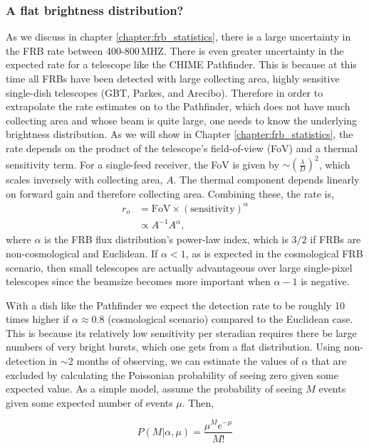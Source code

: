 \subsubsection{A flat brightness distribution?}
As we discuss in chapter \ref{chapter:frb_statistics}, there is 
a large uncertainty in the FRB rate between 400-800\,MHZ. There 
is even greater uncertainty in the expected rate for a 
telescope like the CHIME Pathfinder. This is because at this time
all FRBs
have been detected with large collecting area, highly sensitive single-dish 
telescopes (GBT, Parkes, and Arecibo). Therefore in order to 
extrapolate the rate estimates on to the Pathfinder, which 
does not have much collecting area and whose beam is quite large, one 
needs to know the underlying brightness distribution. As we will show 
in Chapter \ref{chapter:frb_statistics}, the rate depends on the product 
of the telescope's field-of-view (FoV) and a thermal sensitivity term. 
For a single-feed receiver, the FoV is given by 
$\sim \left(\frac{\lambda}{D}\right)^2$, which scales inversely with 
collecting area, $A$. The thermal component depends linearly
on forward gain and therefore collecting area. Combining these, 
the rate is, 
\begin{align}
r_o &= \textrm{FoV} \times \left(\textrm{sensitivity}\right)^\alpha\\
     & \propto A^{-1} A^\alpha,
\end{align}
where $\alpha$ is the FRB flux distribution's power-law index, which is 
$3/2$ if FRBs are non-cosmological and Euclidean. If $\alpha < 1$, 
as is expected in the cosmological FRB scenario, then 
small telescopes are actually advantageous over large single-pixel telescopes 
since the beamsize becomes more important when $\alpha-1$ is negative. 

With a dish like the Pathfinder
we expect the detection rate to be 
roughly 10 times higher if $\alpha\approx 0.8$ (cosmological scenario) 
compared to the Euclidean case. This is because its relatively 
low sensitivity per steradian requires there be large numbers 
of very bright bursts, which one gets from a flat distribution.
Using non-detection in $\sim$2 months of observing, we can 
estimate the values of $\alpha$ that are excluded 
by calculating the Poissonian probability of seeing zero 
given some expected value. As a simple model, assume
the probability of seeing $M$ events given some expected 
number of events $\mu$. Then,

\begin{equation}
     P(M | \alpha, \mu) = \frac{\mu^M e^{-\mu}}{M!}
\end{equation}

